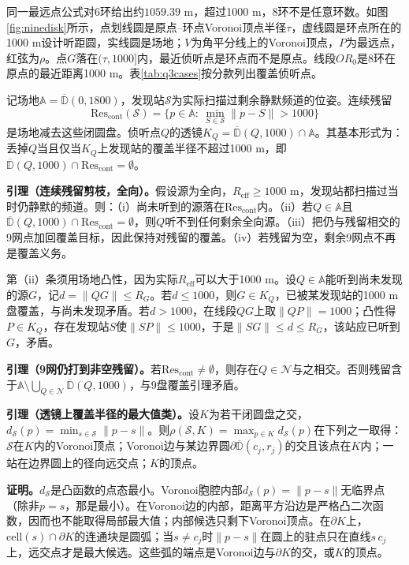 \documentclass{cumcmthesis}
\begin{document}
同一最远点公式对6环给出约$1059.39$ m，超过1000 m，8环不是任意环数。如图\ref{fig:ninedisk}所示，点划线圆是原点--环点Voronoi顶点半径$\tau$，虚线圆是环点所在的1000 m设计听距圆，实线圆是场地；$V$为角平分线上的Voronoi顶点，$P$为最远点，红弦为$\rho$。点$G$落在$(\tau,1000]$内，最近侦听点是环点而不是原点。线段$OR_0$是8环在原点的最近距离1000 m。表\ref{tab:q3cases}按分款列出覆盖侦听点。

记场地$\mathbb{A}=\overline{\mathbb{D}}(0,1800)$，发现站$\mathcal{S}$为实际扫描过剩余静默频道的位姿。连续残留
\begin{equation}
\mathrm{Res}_{\mathrm{cont}}(\mathcal{S})=\bigl\{p\in\mathbb{A}:\ \min_{S\in\mathcal{S}}\|p-S\|>1000\bigr\}
\label{eq:rescont}
\end{equation}
是场地减去这些闭圆盘。侦听点$Q$的透镜$K_Q=\overline{\mathbb{D}}(Q,1000)\cap\mathbb{A}$。其基本形式为：丢掉$Q$当且仅当$K_Q$上发现站的覆盖半径不超过1000 m，即$\overline{\mathbb{D}}(Q,1000)\cap\mathrm{Res}_{\mathrm{cont}}=\emptyset$。

\textbf{引理（连续残留剪枝，全向）。}假设源为全向，$R_{\mathrm{eff}}\ge 1000$ m，发现站都扫描过当时仍静默的频道。则：（i）尚未听到的源落在$\mathrm{Res}_{\mathrm{cont}}$内。（ii）若$Q\in\mathbb{A}$且$\overline{\mathbb{D}}(Q,1000)\cap\mathrm{Res}_{\mathrm{cont}}=\emptyset$，则$Q$听不到任何剩余全向源。（iii）把仍与残留相交的9网点加回覆盖目标，因此保持对残留的覆盖。（iv）若残留为空，剩余9网点不再是覆盖义务。

第（ii）条须用场地凸性，因为实际$R_{\mathrm{eff}}$可以大于1000 m。设$Q\in\mathbb{A}$能听到尚未发现的源$G$，记$d=\|QG\|\le R_G$。若$d\le 1000$，则$G\in K_Q$，已被某发现站的1000 m盘覆盖，与尚未发现矛盾。若$d>1000$，在线段$QG$上取$\|QP\|=1000$；凸性得$P\in K_Q$，存在发现站$S$使$\|SP\|\le 1000$，于是$\|SG\|\le d\le R_G$，该站应已听到$G$，矛盾。

\textbf{引理（9网仍打到非空残留）。}若$\mathrm{Res}_{\mathrm{cont}}\ne\emptyset$，则存在$Q\in\mathcal{N}$与之相交。否则残留含于$\mathbb{A}\setminus\bigcup_{Q\in\mathcal{N}}\overline{\mathbb{D}}(Q,1000)$，与9盘覆盖引理矛盾。

\textbf{引理（透镜上覆盖半径的最大值类）。}设$K$为若干闭圆盘之交，$d_{\mathcal{S}}(p)=\min_{s\in\mathcal{S}}\|p-s\|$。则$\rho(\mathcal{S},K)=\max_{p\in K}d_{\mathcal{S}}(p)$在下列之一取得：$\mathcal{S}$在$K$内的Voronoi顶点；Voronoi边与某边界圆$\partial\overline{\mathbb{D}}(c_j,r_j)$的交且该点在$K$内；一站在边界圆上的径向远交点；$K$的顶点。

\textbf{证明。}$d_{\mathcal{S}}$是凸函数的点态最小。Voronoi胞腔内部$d_{\mathcal{S}}(p)=\|p-s\|$无临界点（除非$p=s$，那是最小）。在Voronoi边的内部，距离平方沿边是严格凸二次函数，因而也不能取得局部最大值；内部候选只剩下Voronoi顶点。在$\partial K$上，$\mathrm{cell}(s)\cap\partial K$的连通块是圆弧；当$s\neq c_j$时$\|p-s\|$在圆上的驻点只在直线$s\,c_j$上，远交点才是最大候选。这些弧的端点是Voronoi边与$\partial K$的交，或$K$的顶点。
\end{document}
